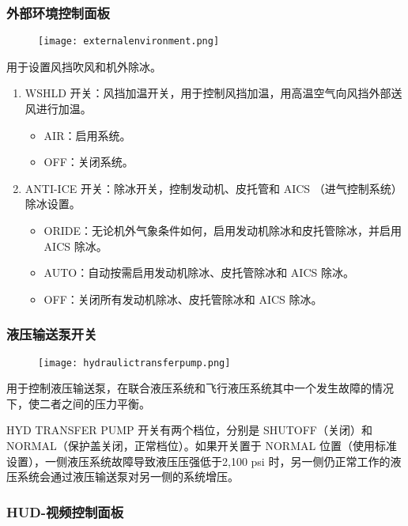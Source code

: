 \subsubsection{外部环境控制面板}

\begin{figure}[htb]
	\centering
	\texttt{[image: externalenvironment.png]}
\end{figure}
用于设置风挡吹风和机外除冰。

\begin{enumerate}
	\item WSHLD 开关：风挡加温开关，用于控制风挡加温，用高温空气向风挡外部送风进行加温。
	      \begin{itemize}
		      \item AIR：启用系统。
		      \item OFF：关闭系统。
	      \end{itemize}
	\item ANTI-ICE 开关：除冰开关，控制发动机、皮托管和 AICS （进气控制系统）除冰设置。
	      \begin{itemize}
		      \item ORIDE：无论机外气象条件如何，启用发动机除冰和皮托管除冰，并启用 AICS 除冰。
		      \item AUTO：自动按需启用发动机除冰、皮托管除冰和 AICS 除冰。
		      \item OFF：关闭所有发动机除冰、皮托管除冰和 AICS 除冰。
	      \end{itemize}
\end{enumerate}

\subsubsection{液压输送泵开关}

\begin{figure}[htb]
	\centering
	\texttt{[image: hydraulictransferpump.png]}
\end{figure}
用于控制液压输送泵，在联合液压系统和飞行液压系统其中一个发生故障的情况下，使二者之间的压力平衡。

HYD TRANSFER PUMP 开关有两个档位，分别是 SHUTOFF（关闭）和 NORMAL（保护盖关闭，正常档位）。如果开关置于 NORMAL 位置（使用标准设置），一侧液压系统故障导致液压压强低于2,100 psi 时，另一侧仍正常工作的液压系统会通过液压输送泵对另一侧的系统增压。

\subsubsection{HUD-视频控制面板}

